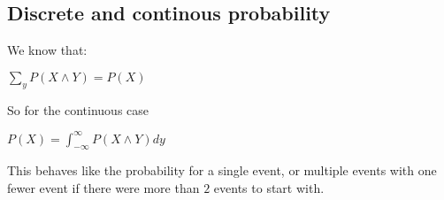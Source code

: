 
\subsection{Discrete and continous probability}

We know that:

$\sum_yP(X\land Y)=P(X)$

So for the continuous case

$P(X)=\int_{-\infty }^{\infty }P(X\land Y)dy$

This behaves like the probability for a single event, or multiple events with one fewer event if there were more than \(2\) events to start with.

